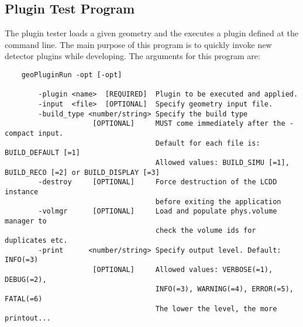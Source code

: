 \subsection{Plugin Test Program}
\label{sec:dd4hep-manual-plugin-test}

The plugin tester loads a given geometry and the executes a plugin defined at the command line. The main purpose of this program is to quickly  invoke new detector plugins while developing. The arguments for this  program are:
\begin{verbatim}
    geoPluginRun -opt [-opt]                                                
    
        -plugin <name>  [REQUIRED]  Plugin to be executed and applied.        
        -input  <file>  [OPTIONAL]  Specify geometry input file.              
        -build_type <number/string> Specify the build type                         
                     [OPTIONAL]     MUST come immediately after the -compact input.
                                    Default for each file is: BUILD_DEFAULT [=1]   
                                    Allowed values: BUILD_SIMU [=1], BUILD_RECO [=2] or BUILD_DISPLAY [=3]
        -destroy     [OPTIONAL]     Force destruction of the LCDD instance         
                                    before exiting the application                 
        -volmgr      [OPTIONAL]     Load and populate phys.volume manager to       
                                    check the volume ids for duplicates etc.       
        -print      <number/string> Specify output level. Default: INFO(=3)        
                     [OPTIONAL]     Allowed values: VERBOSE(=1), DEBUG(=2),        
                                    INFO(=3), WARNING(=4), ERROR(=5), FATAL(=6)    
                                    The lower the level, the more printout...
\end{verbatim}
